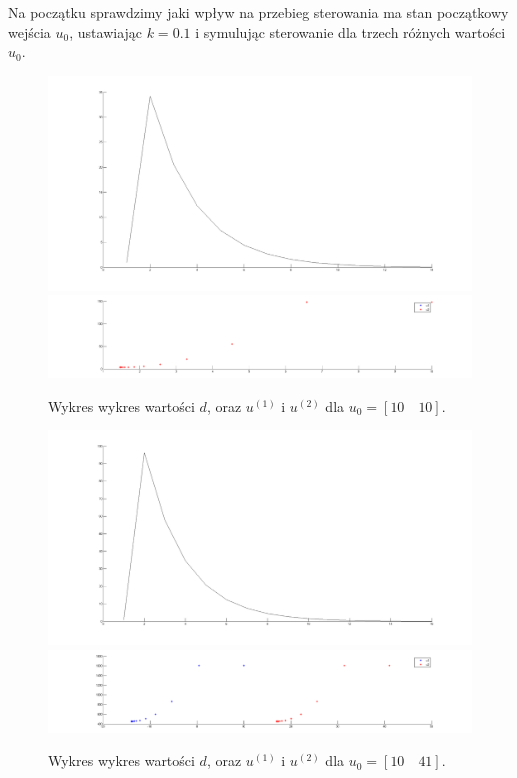 \documentclass[a4paper,10pt]{article}
\begin{document}
Na początku sprawdzimy jaki wpływ na przebieg sterowania ma stan początkowy wejścia $u_0$, ustawiając $k=0.1$ i symulując sterowanie dla trzech różnych wartości $u_0$.
\begin{figure}[!h]
    \centering
	\includegraphics[width=120mm]{CW4-alg1fun1-u10_10-k01-d.png}
	\includegraphics[width=120mm]{CW4-alg1fun1-u10_10-k01-u.png}
	\caption{Wykres wykres wartości $d$, oraz $u^{(1)}$ i $u^{(2)}$ dla $u_0=[10 \quad 10]$.}
    \label{fig:Rysunek}
\end{figure}
\begin{figure}[!h]
    \centering
	\includegraphics[width=120mm]{CW4-alg1fun1-u10_41-k01-d.png}
	\includegraphics[width=120mm]{CW4-alg1fun1-u10_41-k01-u.png}
	\caption{Wykres wykres wartości $d$, oraz $u^{(1)}$ i $u^{(2)}$ dla $u_0=[10 \quad 41]$.}
    \label{fig:Rysunek}
\end{figure}
\end{document}
